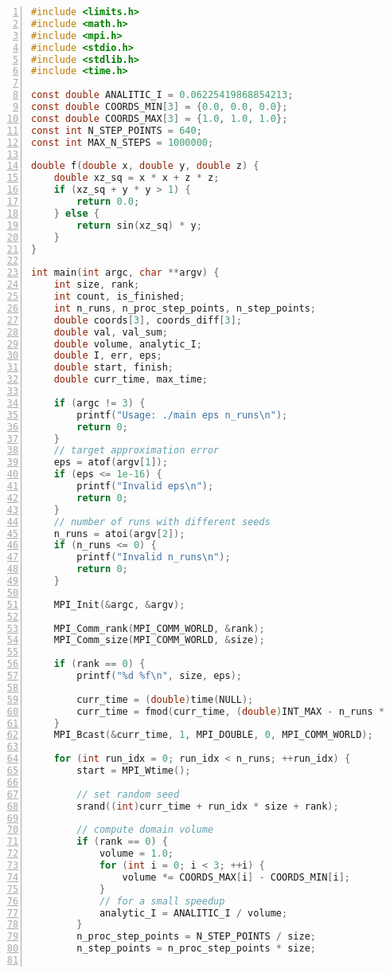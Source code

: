 \documentclass[oneside, final, 12pt]{extarticle}
\begin{document}
\begin{lstlisting}[language=C, style=CStyle, numbers=left]
#include <limits.h>
#include <math.h>
#include <mpi.h>
#include <stdio.h>
#include <stdlib.h>
#include <time.h>

const double ANALITIC_I = 0.06225419868854213;
const double COORDS_MIN[3] = {0.0, 0.0, 0.0};
const double COORDS_MAX[3] = {1.0, 1.0, 1.0};
const int N_STEP_POINTS = 640;
const int MAX_N_STEPS = 1000000;

double f(double x, double y, double z) {
    double xz_sq = x * x + z * z;
    if (xz_sq + y * y > 1) {
        return 0.0;
    } else {
        return sin(xz_sq) * y;
    }
}

int main(int argc, char **argv) {
    int size, rank;
    int count, is_finished;
    int n_runs, n_proc_step_points, n_step_points;
    double coords[3], coords_diff[3];
    double val, val_sum;
    double volume, analytic_I;
    double I, err, eps;
    double start, finish;
    double curr_time, max_time;

    if (argc != 3) {
        printf("Usage: ./main eps n_runs\n");
        return 0;
    }
    // target approximation error
    eps = atof(argv[1]);
    if (eps <= 1e-16) {
        printf("Invalid eps\n");
        return 0;
    }
    // number of runs with different seeds
    n_runs = atoi(argv[2]);
    if (n_runs <= 0) {
        printf("Invalid n_runs\n");
        return 0;
    }

    MPI_Init(&argc, &argv);

    MPI_Comm_rank(MPI_COMM_WORLD, &rank);
    MPI_Comm_size(MPI_COMM_WORLD, &size);

    if (rank == 0) {
        printf("%d %f\n", size, eps);

        curr_time = (double)time(NULL);
        curr_time = fmod(curr_time, (double)INT_MAX - n_runs * size);
    }
    MPI_Bcast(&curr_time, 1, MPI_DOUBLE, 0, MPI_COMM_WORLD);

    for (int run_idx = 0; run_idx < n_runs; ++run_idx) {
        start = MPI_Wtime();

        // set random seed
        srand((int)curr_time + run_idx * size + rank);

        // compute domain volume
        if (rank == 0) {
            volume = 1.0;
            for (int i = 0; i < 3; ++i) {
                volume *= COORDS_MAX[i] - COORDS_MIN[i];
            }
            // for a small speedup
            analytic_I = ANALITIC_I / volume;
        }
        n_proc_step_points = N_STEP_POINTS / size;
        n_step_points = n_proc_step_points * size;


\end{lstlisting}
\end{document}
